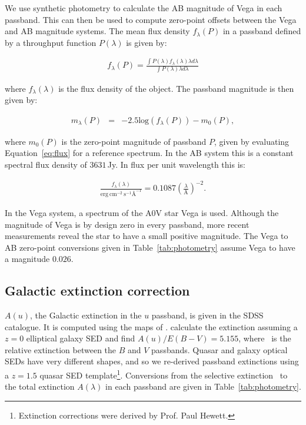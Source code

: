 We use synthetic photometry to calculate the AB magnitude of Vega in each passband. 
This can then be used to compute zero-point offsets between the Vega and AB magnitude systems. 
The mean flux density $f_\lambda(P)$ in a passband defined by a throughput function $P(\lambda)$ is given by: 

\begingroup\makeatletter{}\check@mathfonts
\begin{eqnarray}
\label{eq:flux}
  f_\lambda(P) = \frac {\int P(\lambda)f_\lambda(\lambda)\lambda d\lambda} {\int P(\lambda)\lambda d\lambda} 
\end{eqnarray}
\endgroup

\noindent where $f_\lambda(\lambda)$ is the flux density of the object. 
The passband magnitude is then given by:   

\begingroup\makeatletter{}\check@mathfonts
\begin{eqnarray}
\label{eq:mag}
  m_\lambda(P) & = & -2.5\text{log}(f_\lambda(P)) - m_0(P), 
\end{eqnarray}
\endgroup

\noindent where $m_0(P)$ is the zero-point magnitude of passband $P$, given by evaluating Equation~\ref{eq:flux} for a reference spectrum. 
In the AB system this is a constant spectral flux density of $3631$\,Jy. 
In flux per unit wavelength this is:  

\begingroup\makeatletter{}\check@mathfonts
\begin{eqnarray}
  \frac{f_\lambda(\lambda)}{\text{erg}~\text{cm}^{-2}~\text{s}^{-1} \text{\AA}^{-1}} = 0.1087 \left(\frac{\lambda}{\text{\AA}}\right)^{-2}.
\end{eqnarray}
\endgroup

\noindent In the Vega system, a spectrum of the A$0$V star Vega is used. 
Although the magnitude of Vega is by design zero in every passband, more recent measurements reveal the star to have a small positive magnitude. 
The Vega to AB zero-point conversions given in Table~\ref{tab:photometry} assume Vega to have a magnitude $0.026$. 

\subsection{Galactic extinction correction}

$A(u)$, the Galactic extinction in the $u$ passband, is given in the SDSS catalogue. 
It is computed using the maps of \citet{schlegel98}.
\citet{schlegel98} calculate the extinction assuming a $z=0$ elliptical galaxy SED and find $A(u)/E(B-V)=5.155$, where \ebv\, is the relative extinction between the $B$ and $V$ passbands. 
Quasar and galaxy optical SEDs have very different shapes, and so we re-derived passband extinctions using a $z=1.5$ quasar SED template\footnote{Extinction corrections were derived by Prof. Paul Hewett.}.
Conversions from the selective extinction \ebv\, to the total extinction $A(\lambda)$ in each passband are given in Table~\ref{tab:photometry}.  
 

